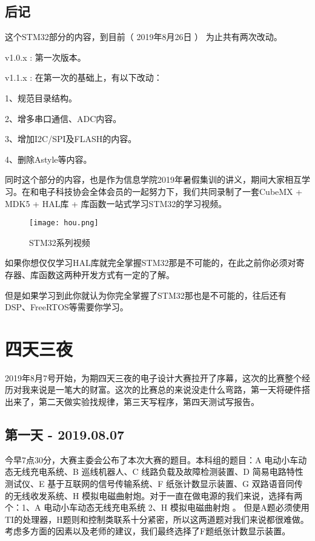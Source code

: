 \documentclass[cn,11pt]{elegantbook}
\begin{document}
\section{后记}

这个STM32部分的内容，到目前（  2019年8月26日 ） 为止共有两次改动。

v1.0.x : 第一次版本。

v1.1.x : 在第一次的基础上，有以下改动：

1、规范目录结构。

2、增多串口通信、ADC内容。

3、增加I2C/SPI及FLASH的内容。

4、删除Astyle等内容。

同时这个部分的内容，也是作为信息学院2019年暑假集训的讲义，期间大家相互学习。在和电子科技协会全体会员的一起努力下，我们共同录制了一套CubeMX + MDK5 + HAL库 + 库函数一站式学习STM32的学习视频。
	
\begin{figure}[htbp]
	\centering
	\texttt{[image: hou.png]}
	\caption{ STM32系列视频 \label{fig:scatter}}
\end{figure}

如果你想仅仅学习HAL库就完全掌握STM32那是不可能的，在此之前你必须对寄存器、库函数这两种开发方式有一定的了解。

但是如果学习到此你就认为你完全掌握了STM32那也是不可能的，往后还有DSP、FreeRTOS等需要你学习。

\chapter{四天三夜}

2019年8月7号开始，为期四天三夜的电子设计大赛拉开了序幕，这次的比赛整个经历对我来说是一笔大的财富。这次的比赛总的来说没走什么弯路，第一天将硬件搭出来了，第二天做实验找规律，第三天写程序，第四天测试写报告。

\section{第一天 - 2019.08.07}
今早7点30分，大赛主委会公布了本次大赛的题目。本科组的题目：A 电动小车动态无线充电系统、B	巡线机器人、C	线路负载及故障检测装置、D	简易电路特性测试仪、E	基于互联网的信号传输系统、F	纸张计数显示装置、G	双路语音同传的无线收发系统、H	模拟电磁曲射炮。对于一直在做电源的我们来说，选择有两个：1、A 电动小车动态无线充电系统 2、H	模拟电磁曲射炮 。 但是A题必须使用TI的处理器，H题则和控制类联系十分紧密，所以这两道题对我们来说都很难做。考虑多方面的因素以及老师的建议，我们最终选择了F题纸张计数显示装置。
\end{document}
